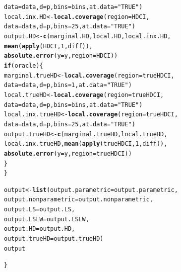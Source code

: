 \documentclass[11pt]{article}\usepackage[]{graphicx}\usepackage[]{color}
\makeatletter
\newcommand{\hlnum}[1]{\textcolor[rgb]{0.686,0.059,0.569}{#1}}%
\newcommand{\hlstr}[1]{\textcolor[rgb]{0.192,0.494,0.8}{#1}}%
\newcommand{\hlstd}[1]{\textcolor[rgb]{0.345,0.345,0.345}{#1}}%
\newcommand{\hlkwa}[1]{\textcolor[rgb]{0.161,0.373,0.58}{\textbf{#1}}}%
\newcommand{\hlkwb}[1]{\textcolor[rgb]{0.69,0.353,0.396}{#1}}%
\newcommand{\hlkwc}[1]{\textcolor[rgb]{0.333,0.667,0.333}{#1}}%
\newcommand{\hlkwd}[1]{\textcolor[rgb]{0.737,0.353,0.396}{\textbf{#1}}}%
\newenvironment{kframe}{%
 \def\at@end@of@kframe{}%
 \ifinner\ifhmode%
  \def\at@end@of@kframe{\end{minipage}}%
  \begin{minipage}{\columnwidth}%
 \fi\fi%
 \def\FrameCommand##1{\hskip\@totalleftmargin \hskip-\fboxsep
 \colorbox{shadecolor}{##1}\hskip-\fboxsep
     \hskip-\linewidth \hskip-\@totalleftmargin \hskip\columnwidth}%
 \MakeFramed {\advance\hsize-\width
   \@totalleftmargin\z@ \linewidth\hsize
   \@setminipage}}%
 {\par\unskip\endMakeFramed%
 \at@end@of@kframe}
\newenvironment{knitrout}{}{} %
\makeatother
\begin{document}
\begin{knitrout}
\begin{kframe}
\begin{alltt}
      \hlkwc{data} \hlstd{= data,} \hlkwc{d} \hlstd{= p,} \hlkwc{bins} \hlstd{= bins,} \hlkwc{at.data} \hlstd{=} \hlstr{"TRUE"}\hlstd{)}
    \hlstd{local.inx.HD} \hlkwb{<-} \hlkwd{local.coverage}\hlstd{(}\hlkwc{region} \hlstd{= HDCI,}
      \hlkwc{data} \hlstd{= data,} \hlkwc{d} \hlstd{= p,} \hlkwc{bins} \hlstd{=} \hlnum{25}\hlstd{,} \hlkwc{at.data} \hlstd{=} \hlstr{"TRUE"}\hlstd{)}
    \hlstd{output.HD} \hlkwb{<-} \hlkwd{c}\hlstd{(marginal.HD, local.HD, local.inx.HD,}
      \hlkwd{mean}\hlstd{(}\hlkwd{apply}\hlstd{(HDCI,} \hlnum{1}\hlstd{, diff)),}
      \hlkwd{absolute.error}\hlstd{(}\hlkwc{y} \hlstd{= y,} \hlkwc{region} \hlstd{= HDCI))}
    \hlkwa{if}\hlstd{(oracle)\{}
      \hlstd{marginal.trueHD} \hlkwb{<-} \hlkwd{local.coverage}\hlstd{(}\hlkwc{region} \hlstd{= trueHDCI,}
        \hlkwc{data} \hlstd{= data,} \hlkwc{d} \hlstd{= p,} \hlkwc{bins} \hlstd{=} \hlnum{1}\hlstd{,} \hlkwc{at.data} \hlstd{=} \hlstr{"TRUE"}\hlstd{)}
      \hlstd{local.trueHD} \hlkwb{<-} \hlkwd{local.coverage}\hlstd{(}\hlkwc{region} \hlstd{= trueHDCI,}
        \hlkwc{data} \hlstd{= data,} \hlkwc{d} \hlstd{= p,} \hlkwc{bins} \hlstd{= bins,} \hlkwc{at.data} \hlstd{=} \hlstr{"TRUE"}\hlstd{)}
      \hlstd{local.inx.trueHD} \hlkwb{<-} \hlkwd{local.coverage}\hlstd{(}\hlkwc{region} \hlstd{= trueHDCI,}
        \hlkwc{data} \hlstd{= data,} \hlkwc{d} \hlstd{= p,} \hlkwc{bins} \hlstd{=} \hlnum{25}\hlstd{,} \hlkwc{at.data} \hlstd{=} \hlstr{"TRUE"}\hlstd{)}
      \hlstd{output.trueHD} \hlkwb{<-} \hlkwd{c}\hlstd{(marginal.trueHD, local.trueHD,}
        \hlstd{local.inx.trueHD,} \hlkwd{mean}\hlstd{(}\hlkwd{apply}\hlstd{(trueHDCI,} \hlnum{1}\hlstd{, diff)),}
        \hlkwd{absolute.error}\hlstd{(}\hlkwc{y} \hlstd{= y,} \hlkwc{region} \hlstd{= trueHDCI))}
    \hlstd{\}}
  \hlstd{\}}

  \hlstd{output} \hlkwb{<-} \hlkwd{list}\hlstd{(}\hlkwc{output.parametric} \hlstd{= output.parametric,}
    \hlkwc{output.nonparametric} \hlstd{= output.nonparametric,}
    \hlkwc{output.LS} \hlstd{= output.LS,}
    \hlkwc{output.LSLW} \hlstd{= output.LSLW,}
    \hlkwc{output.HD} \hlstd{= output.HD,}
    \hlkwc{output.trueHD} \hlstd{= output.trueHD)}
  \hlstd{output}

\hlstd{\}}
\end{alltt}
\end{kframe}
\end{knitrout}


\end{document}
